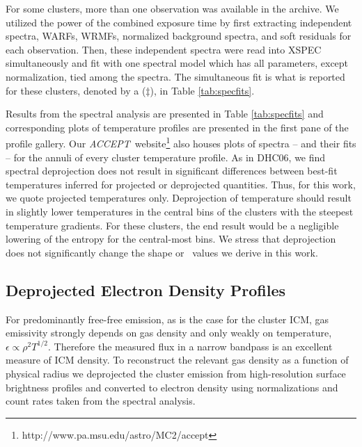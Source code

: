 \documentclass[12pt, preprint]{aastex}
\newcommand{\accept}{\textit{ACCEPT}}
\begin{document}
For some clusters, more than one observation was available in the
archive. We utilized the power of the combined exposure time by first
extracting independent spectra, WARFs, WRMFs, normalized background
spectra, and soft residuals for each observation. Then, these
independent spectra were read into \textsc{XSPEC} simultaneously and
fit with one spectral model which has all parameters, except
normalization, tied among the spectra. The simultaneous fit is what is
reported for these clusters, denoted by a ($\ddagger$), in Table
\ref{tab:specfits}.

Results from the spectral analysis are presented in Table
\ref{tab:specfits} and corresponding plots of temperature profiles are
presented in the first pane of the profile gallery. Our \accept\
website\footnote{http://www.pa.msu.edu/astro/MC2/accept} also houses
plots of spectra -- and their fits -- for the annuli of every cluster
temperature profile. As in DHC06, we find spectral deprojection does
not result in significant differences between best-fit temperatures
inferred for projected or deprojected quantities. Thus, for this work,
we quote projected temperatures only. Deprojection of temperature
should result in slightly lower temperatures in the central bins of
the clusters with the steepest temperature gradients. For these
clusters, the end result would be a negligible lowering of the entropy
for the central-most bins. We stress that deprojection does not
significantly change the shape or \kna\ values we derive in this
work.

\subsection{Deprojected Electron Density Profiles}
\label{sec:dene}

For predominantly free-free emission, as is the case for the cluster
ICM, gas emissivity strongly depends on gas density and only weakly on
temperature, $\epsilon \propto \rho^2 T^{1/2}$. Therefore the measured
flux in a narrow bandpass is an excellent measure of ICM density. To
reconstruct the relevant gas density as a function of physical radius
we deprojected the cluster emission from high-resolution surface
brightness profiles and converted to electron density using
normalizations and count rates taken from the spectral analysis.
\end{document}
